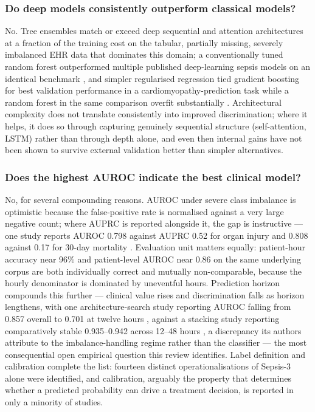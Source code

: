 \documentclass[conference]{IEEEtran}
\begin{document}
\subsubsection{Do deep models consistently outperform classical models?}

No. Tree ensembles match or exceed deep sequential and attention architectures at a fraction of the training cost on the tabular, partially missing, severely imbalanced EHR data that dominates this domain; a conventionally tuned random forest outperformed multiple published deep-learning sepsis models on an identical benchmark \cite{r30}, and simpler regularised regression tied gradient boosting for best validation performance in a cardiomyopathy-prediction task while a random forest in the same comparison overfit substantially \cite{r25}. Architectural complexity does not translate consistently into improved discrimination; where it helps, it does so through capturing genuinely sequential structure (self-attention, LSTM) rather than through depth alone, and even then internal gains have not been shown to survive external validation better than simpler alternatives.

\subsubsection{Does the highest AUROC indicate the best clinical model?}

No, for several compounding reasons. AUROC under severe class imbalance is optimistic because the false-positive rate is normalised against a very large negative count; where AUPRC is reported alongside it, the gap is instructive --- one study reports AUROC 0.798 against AUPRC 0.52 for organ injury and 0.808 against 0.17 for 30-day mortality \cite{r16}. Evaluation unit matters equally: patient-hour accuracy near 96\% and patient-level AUROC near 0.86 on the same underlying corpus are both individually correct and mutually non-comparable, because the hourly denominator is dominated by uneventful hours. Prediction horizon compounds this further --- clinical value rises and discrimination falls as horizon lengthens, with one architecture-search study reporting AUROC falling from 0.857 overall to 0.701 at twelve hours \cite{r31}, against a stacking study reporting comparatively stable 0.935--0.942 across 12--48 hours \cite{r14}, a discrepancy its authors attribute to the imbalance-handling regime rather than the classifier --- the most consequential open empirical question this review identifies. Label definition and calibration complete the list: fourteen distinct operationalisations of Sepsis-3 alone were identified, and calibration, arguably the property that determines whether a predicted probability can drive a treatment decision, is reported in only a minority of studies.
\end{document}
